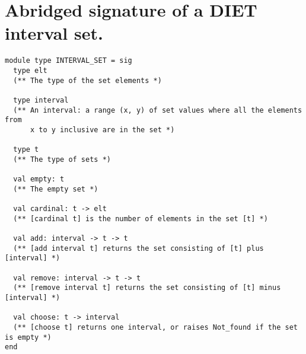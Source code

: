 \section{Abridged signature of a DIET interval set.}
\label{app:diet-sig}

\centering
\begin{verbatim}
module type INTERVAL_SET = sig
  type elt
  (** The type of the set elements *)

  type interval
  (** An interval: a range (x, y) of set values where all the elements from
      x to y inclusive are in the set *)

  type t
  (** The type of sets *)

  val empty: t
  (** The empty set *)

  val cardinal: t -> elt
  (** [cardinal t] is the number of elements in the set [t] *)

  val add: interval -> t -> t
  (** [add interval t] returns the set consisting of [t] plus [interval] *)

  val remove: interval -> t -> t
  (** [remove interval t] returns the set consisting of [t] minus [interval] *)

  val choose: t -> interval
  (** [choose t] returns one interval, or raises Not_found if the set is empty *)
end
\end{verbatim}
